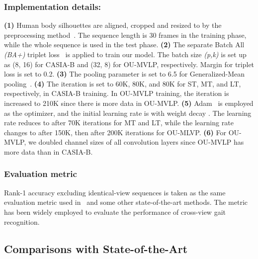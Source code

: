 \documentclass[runningheads]{llncs}
\begin{document}
\subsubsection{Implementation details:} \textbf{(1)} Human body silhouettes are aligned, cropped and resized to  by the preprocessing method~\cite{oumvlp}. The sequence length is 30 frames in the training phase, while the whole sequence is used in the test phase. \textbf{(2)} The separate Batch All \textit{(BA+)} triplet loss~\cite{triplet} is applied to train our model. The batch size \textit{(p,k)} is set up as (8, 16) for CASIA-B and (32, 8) for OU-MVLP, respectively. Margin  for triplet loss is set to 0.2. \textbf{(3)} The pooling parameter  is set to 6.5 for Generalized-Mean pooling~\cite{gem}.  \textbf{(4)} The iteration is set to 60K, 80K, and 80K for ST, MT, and LT, respectively, in CASIA-B training. In OU-MVLP training, the iteration is increased to 210K since there is more data in OU-MVLP. 
\textbf{(5)} Adam~\cite{adam} is employed as the optimizer, and the initial learning rate is  with weight decay . The learning rate reduces to  after 70K iterations for MT and LT, while the learning rate changes to  after 150K, then  after 200K iterations for OU-MLVP.
\textbf{(6)} For OU-MVLP, we doubled channel sizes of all convolution layers since OU-MVLP has more data than in CASIA-B.

\subsubsection{Evaluation metric} Rank-1 accuracy excluding identical-view sequences is taken as the same evaluation metric used in~\cite{aaai2019gaitset} and some other state-of-the-art methods. The metric has been widely employed to evaluate the performance of cross-view gait recognition. 



\subsection{Comparisons with State-of-the-Art}
\end{document}
